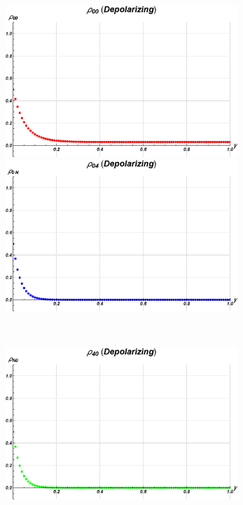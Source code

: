 \begin{figure}[h!]
\begin{minipage}[c]{0.5\linewidth}
\hspace{1cm}
\centering \includegraphics[width=0.78\textwidth]{./chapter3/Cirq_nuovo/decoerenza/dep_00.eps}
\end{minipage}
\begin{minipage}[]{0.5\linewidth}
\centering \includegraphics[width=0.78\textwidth]{./chapter3/Cirq_nuovo/decoerenza/dep_0N.eps}
\end{minipage} \\
\begin{minipage}[c]{0.5\linewidth}
\hspace{1cm}
\centering \includegraphics[width=0.78\textwidth]{./chapter3/Cirq_nuovo/decoerenza/dep_N0.eps}

\end{minipage}
\end{figure}
